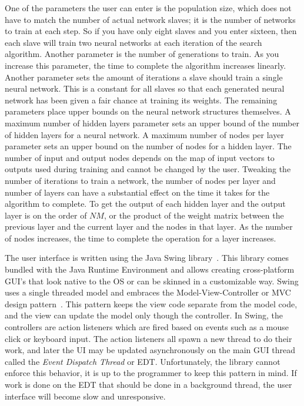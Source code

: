 One of the parameters the user can enter is the population size, which does not have to match the number of actual network slaves; it is the number of networks to train at each step. 
So if you have only eight slaves and you enter sixteen, then each slave will train two neural networks at each iteration of the search algorithm. 
Another parameter is the number of generations to train. 
As you increase this parameter, the time to complete the algorithm increases linearly. 
Another parameter sets the amount of iterations a slave should train a single neural network. 
This is a constant for all slaves so that each generated neural network has been given a fair chance at training its weights. 
The remaining parameters place upper bounds on the neural network structures themselves. 
A maximum number of hidden layers parameter sets an upper bound of the number of hidden layers for a neural network. 
A maximum number of nodes per layer parameter sets an upper bound on the number of nodes for a hidden layer. 
The number of input and output nodes depends on the map of input vectors to outputs used during training and cannot be changed by the user. 
Tweaking the number of iterations to train a network, the number of nodes per layer and number of layers can have a substantial effect on the time it takes for the algorithm to complete. 
To get the output of each hidden layer and the output layer is on the
order of $NM$, or the product of the weight matrix between the previous layer and the current layer and the nodes in that layer. 
As the number of nodes increases, the time to complete the operation for a layer increases.

The user interface is written using the Java Swing library~\cite{swing}. 
This library comes bundled with the Java Runtime Environment and allows creating cross-platform GUI's that look native to the OS or can be skinned in a customizable way. 
Swing uses a single threaded model and embraces the Model-View-Controller or MVC design pattern~\cite{mvc}. 
This pattern keeps the view code separate from the model code, and the view can update the model only though the controller. 
In Swing, the controllers are action listeners which are fired based on events such as a mouse click or keyboard input. 
The action listeners all spawn a new thread to do their work, and later the UI may be updated asynchronously on the main GUI thread called the {\it Event Dispatch Thread} or EDT.
Unfortunately, the library cannot enforce this behavior, it is up to the programmer to keep this pattern in mind.
If work is done on the EDT that should be done in a background thread, the user interface will become slow and unresponsive. 

